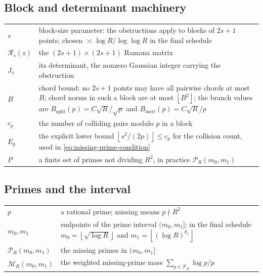 \documentclass[11pt]{article}
\newcommand{\floor}[1]{\left\lfloor #1 \right\rfloor}
\newcommand{\M}{\mathcal M}
\begin{document}
\subsection*{Block and determinant machinery}

\begin{center}
\begin{tabular}{@{}lp{}@{}}
\(s\) & block-size parameter: the obstructions apply to blocks of \(2s+1\) points; chosen \(\asymp\log R/\log\log R\) in the final schedule \\
\(\mathcal R_s(z)\) & the \((2s+1)\times(2s+1)\) Ramana matrix \\
\(J_s\) & its determinant, the nonzero Gaussian integer carrying the obstruction \\
\(B\) & chord bound: no \(2s+1\) points may have all pairwise chords at most \(B\); chord norms in such a block are at most \(\floor{B^2}\); the branch values are \(B_{\mathrm{split}}(p)=C\sqrt R/\sqrt p\) and \(B_{\mathrm{inert}}(p)=C\sqrt R/p\) \\
\(c_p\) & the number of colliding pairs modulo \(p\) in a block \\
\(E_p\) & the explicit lower bound \(\floor{s^2/(2p)}\le c_p\) for the collision count, used in \eqref{eq:missing-prime-condition} \\
\(P\) & a finite set of primes not dividing \(R^2\), in practice \(\mathcal P_R(m_0,m_1)\)
\end{tabular}
\end{center}

\subsection*{Primes and the interval}

\begin{center}
\begin{tabular}{@{}lp{}@{}}
\(p\) & a rational prime; missing means \(p\nmid R^2\) \\
\(m_0,m_1\) & endpoints of the prime interval \((m_0,m_1]\); in the final schedule \(m_0=\floor{\sqrt{\log R}}\) and \(m_1=\floor{(\log R)^{\theta_1}}\) \\
\(\mathcal P_R(m_0,m_1)\) & the missing primes in \((m_0,m_1]\) \\
\(\M_R(m_0,m_1)\) & the weighted missing-prime mass \(\sum_{p\in\mathcal P_R}\log p/p\)
\end{tabular}
\end{center}
\end{document}
